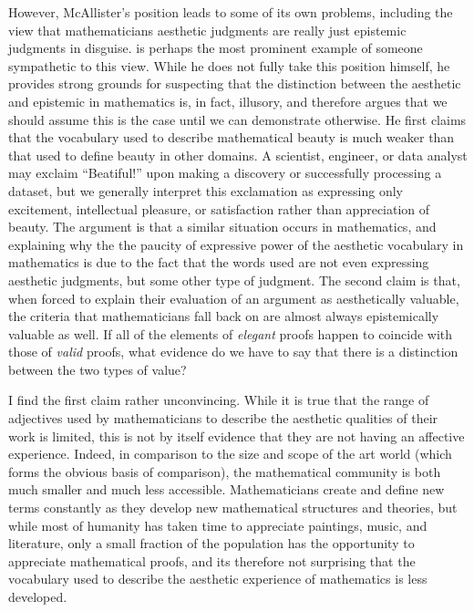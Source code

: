 \documentclass[a4paper,man,natbib]{apa6}
\begin{document}
However, McAllister's position leads to some of its own problems, including the view that mathematicians aesthetic
judgments are really just epistemic judgments in disguise. \cite{todd_unmasking_2008} is perhaps the most prominent
example of someone sympathetic to this view. While he does not fully take this position himself, he provides 
strong grounds for suspecting that the distinction between the aesthetic and epistemic in mathematics is, in fact,
illusory, and therefore argues that we should assume this is the case until we can demonstrate otherwise. He first 
claims that the vocabulary used to
describe mathematical beauty is much weaker than that used to define beauty in other domains. A scientist, engineer,
or data analyst may exclaim ``Beatiful!'' upon making a discovery or successfully processing a dataset, but we generally
interpret this exclamation as expressing only excitement, intellectual pleasure, or satisfaction rather than appreciation
of beauty. The argument is that a similar situation occurs in mathematics, and explaining why the the paucity of expressive
power of the aesthetic vocabulary in mathematics
is due to the fact that the words used are not even expressing aesthetic judgments, but some other type of judgment. The
second claim is that, when forced to explain their evaluation of an argument
as aesthetically valuable, the criteria that mathematicians fall back on are almost always epistemically valuable as well.
If all of the elements of \textit{elegant} proofs happen to coincide with those of \textit{valid} proofs, what evidence do we have to say
that there is a distinction between the two types of value?

I find the first claim rather unconvincing. While it is true that the range of adjectives used by mathematicians to describe
the aesthetic qualities of their work is limited, this is not by itself evidence that they are not having an affective
experience. Indeed, in comparison to the size and scope of the art world (which forms the obvious basis of comparison),
the mathematical community is both much smaller and much less accessible. Mathematicians create and define new terms
constantly as they develop new mathematical structures and theories, but while most of humanity has taken time to 
appreciate paintings, music, and literature, only a small fraction of the population has the opportunity to appreciate
mathematical proofs, and its therefore not surprising that the vocabulary used to describe the aesthetic experience
of mathematics is less developed.
\end{document}

